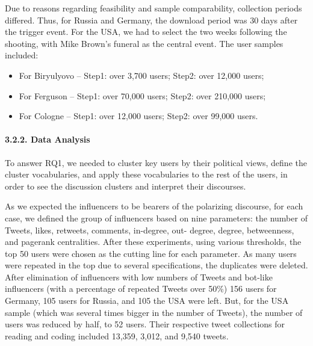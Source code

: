 Due to reasons regarding feasibility and sample comparability, collection periods differed. Thus, for Russia and Germany, the download period was 30 days after the trigger event. For the USA, we had to select the two weeks following the shooting, with Mike Brown’s funeral as the central event. The user samples included:

\begin{itemize}
	\item For Biryulyovo -- Step1: over 3,700 users; Step2: over 12,000 users;
	\item For Ferguson -- Step1: over 70,000 users; Step2: over 210,000 users;
	\item For Cologne -- Step1: over 12,000 users; Step2: over 99,000 users.
\end{itemize}

\paragraph{3.2.2. Data Analysis}

To answer RQ1, we needed to cluster key users by their political views, define the cluster vocabularies, and apply these vocabularies to the rest of the users, in order to see the discussion clusters and interpret their discourses.

As we expected the influencers to be bearers of the polarizing discourse, for each case, we defined the group of influencers based on nine parameters: the number of Tweets, likes, retweets, comments, in-degree, out- degree, degree, betweenness, and pagerank centralities. After these experiments, using various thresholds, the top 50 users were chosen as the cutting line for each parameter. As many users were repeated in the top due to several specifications, the duplicates were deleted. After elimination of influencers with low numbers of Tweets and bot-like influencers (with a percentage of repeated Tweets over 50\%) 156 users for Germany, 105 users for Russia, and 105 the USA were left. But, for the USA sample (which was several times bigger in the number of Tweets), the number of users was reduced by half, to 52 users. Their respective tweet collections for reading and coding included 13,359, 3,012, and 9,540 tweets.

